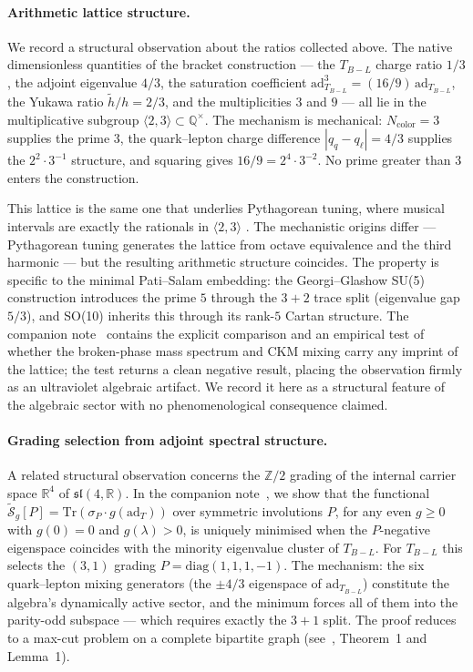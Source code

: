 \documentclass[11pt,a4paper]{article}
\newcommand{\sln}[1]{\mathfrak{sl}(#1,\mathbb{R})}
\theoremstyle{plain}
\theoremstyle{definition}
\theoremstyle{remark}
\begin{document}
\paragraph{Arithmetic lattice structure.}
We record a structural observation about the ratios collected above.
The native dimensionless quantities of the bracket
construction --- the $T_{B-L}$ charge ratio $1/3$, the adjoint
eigenvalue $4/3$, the saturation coefficient
$\mathrm{ad}_{T_{B-L}}^3 = (16/9)\,\mathrm{ad}_{T_{B-L}}$, the Yukawa ratio
$\tilde{h}/h = 2/3$, and the multiplicities $3$ and $9$ --- all lie
in the multiplicative subgroup
$\langle 2, 3 \rangle \subset \mathbb{Q}^\times$.  The mechanism is
mechanical: $N_{\mathrm{color}} = 3$ supplies the prime $3$, the
quark--lepton charge difference $|q_q - q_\ell| = 4/3$ supplies the
$2^2 \cdot 3^{-1}$ structure, and squaring gives
$16/9 = 2^4 \cdot 3^{-2}$.  No prime greater than $3$ enters the
construction.

This lattice is the same one that underlies Pythagorean tuning, where
musical intervals are exactly the rationals in $\langle 2, 3 \rangle$
\cite{Barker1989}.  The mechanistic origins differ --- Pythagorean
tuning generates the lattice from octave equivalence and the third
harmonic --- but the resulting arithmetic structure coincides.  The
property is specific to the minimal Pati--Salam embedding: the
Georgi--Glashow SU(5) construction introduces the prime $5$ through
the $3+2$ trace split (eigenvalue gap $5/3$), and SO(10) inherits
this through its rank-$5$ Cartan structure.  The companion
note~\cite{WallaceN1} contains the explicit comparison and an
empirical test of whether the broken-phase mass spectrum and CKM
mixing carry any imprint of the lattice; the test returns a clean
negative result, placing the observation firmly as an ultraviolet
algebraic artifact.  We record it here as a structural feature of
the algebraic sector with no phenomenological consequence claimed.

\paragraph{Grading selection from adjoint spectral structure.}
A related structural observation concerns the $\mathbb{Z}/2$
grading of the internal carrier space $\mathbb{R}^4$ of $\sln{4}$.
In the companion note~\cite{WallaceN2}, we show that the functional
$\widetilde{\mathcal{S}}_g[P] = \mathrm{Tr}(\sigma_P \cdot g(\mathrm{ad}_T))$
over symmetric involutions $P$, for any even $g \ge 0$ with
$g(0) = 0$ and $g(\lambda) > 0$, is uniquely minimised when the
$P$-negative eigenspace coincides with the minority eigenvalue
cluster of $T_{B{-}L}$.  For $T_{B{-}L}$ this selects the
$(3,1)$ grading $P = \mathrm{diag}(1,1,1,-1)$.  The mechanism:
the six quark--lepton mixing generators (the $\pm 4/3$ eigenspace
of $\mathrm{ad}_{T_{B{-}L}}$) constitute the algebra's dynamically
active sector, and the minimum forces all of them into the
parity-odd subspace --- which requires exactly the $3{+}1$ split.
The proof reduces to a max-cut problem on a complete bipartite
graph (see~\cite{WallaceN2}, Theorem~1 and Lemma~1).
\end{document}

